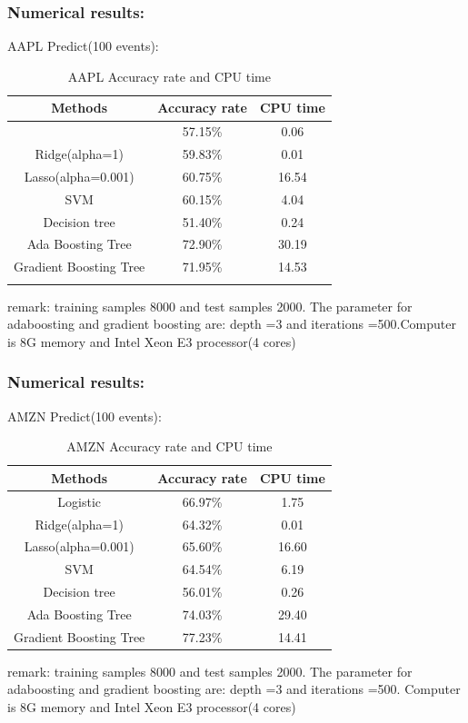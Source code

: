 \documentclass[xcolor={x11names,svgnames,dvipsnames}]{beamer}
\begin{document}
\begin{frame}
\frametitle{Numerical results:}

\begin{block}{AAPL Predict(100 events):}
\begin{table}[h!]\small
  \caption{AAPL Accuracy rate and CPU time}
\begin{center}
    \begin{tabular}{| c | c|c|}
    \hline
    Methods& Accuracy rate& CPU time \\
    \hline\small{
Logistic&57.15\%&0.06\\
Ridge(alpha=1) &59.83\%&0.01\\
Lasso(alpha=0.001)&60.75\%&16.54\\
SVM&60.15\%&4.04\\
Decision tree &51.40\%&0.24\\
Ada Boosting Tree&\alert{72.90\%}&30.19\\
Gradient Boosting Tree&\alert{71.95\%}&14.53\\}
\hline
\end{tabular}
\end{center}
\end{table}
\end{block}
\small{remark: \alert{training samples 8000 and test samples 2000}. The parameter for adaboosting and gradient boosting are: \alert{depth =3 and iterations =500}.Computer is 8G memory and Intel Xeon E3 processor(4 cores)}
\end{frame}


\begin{frame}
\frametitle{Numerical results:}
\small{
\begin{block}{AMZN Predict(100 events):}
\begin{table}[h!]\small
  \caption{AMZN Accuracy rate and CPU time}
\begin{center}
    \begin{tabular}{|c| c|c|}
    \hline
    Methods& Accuracy rate& CPU time \\
    \hline
Logistic&66.97\%&1.75\\
Ridge(alpha=1) &64.32\%&0.01\\
Lasso(alpha=0.001)&65.60\%&16.60\\
SVM&64.54\%&6.19\\
Decision tree &56.01\%&0.26\\
Ada Boosting Tree&\alert{74.03\%}&29.40\\
Gradient Boosting Tree&\alert{77.23\%}&14.41\\
\hline
\end{tabular}
\end{center}
\end{table}
\end{block}}
\small{remark: training samples 8000 and test samples 2000. The parameter for adaboosting and gradient boosting are: depth =3 and iterations =500. Computer is 8G memory and Intel Xeon E3 processor(4 cores)}
\end{frame}
\end{document}
